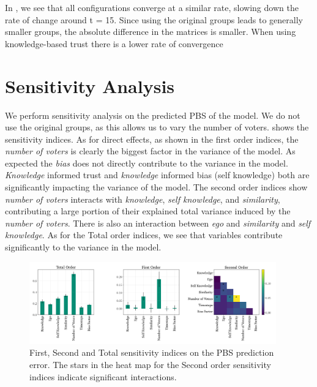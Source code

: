 In , we see that all configurations converge at a
similar rate, slowing down the rate of change around t = 15. Since using the
original groups leads to generally smaller groups, the absolute difference in
the matrices is smaller. When using knowledge-based trust there is a lower rate
of convergence




\section{Sensitivity Analysis} We perform sensitivity analysis on the predicted
PBS of the model. We do not use the original groups, as this allows us to vary
the number of voters.  shows the sensitivity indices.
As for direct effects, as shown in the first order indices, the \textit{number
	of voters} is clearly the biggest factor in the variance of the model. As
expected the \textit{bias} does not directly contribute to the variance in the
model. \textit{Knowledge} informed trust and\textit{ knowledge} informed bias
(self knowledge) both are significantly impacting the variance of the model.
The second order indices show \textit{number of voters} interacts with
\textit{knowledge}, \textit{self knowledge}, and\textit{ similarity},
contributing a large portion of their explained total variance induced by the
\textit{number of voters}. There is also an interaction between \textit{ego}
and \textit{similarity} and \textit{self knowledge}. As for the Total order
indices, we see that variables contribute significantly to the variance in the
model.


\begin{figure}[ht]
	\begin{center}
		\includegraphics[width=0.95\textwidth]{Figures/senstivity_analysis.png}
	\end{center}
	\caption{First, Second and Total sensitivity indices on the PBS prediction error. The stars in the heat map for the Second order sensitivity indices indicate significant interactions. }\label{fig:sensitivty_pbs}
\end{figure}


